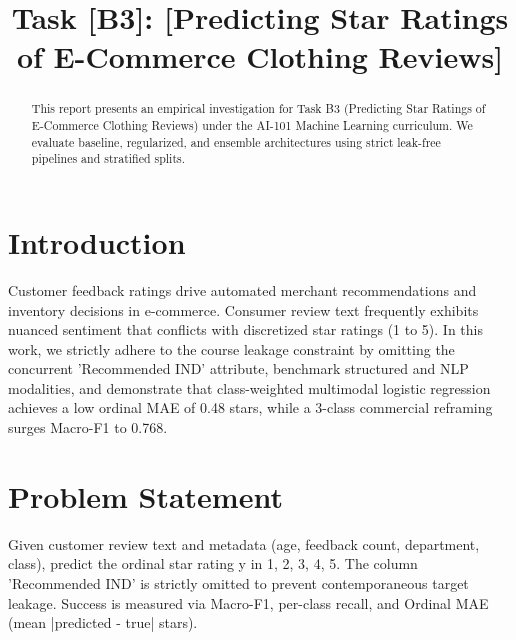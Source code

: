 \documentclass[conference]{IEEEtran}
\begin{document}
\title{Task [B3]: [Predicting Star Ratings of E-Commerce Clothing Reviews]}

\author{
}

\maketitle

\begin{abstract}
This report presents an empirical investigation for Task B3 (Predicting Star Ratings of E-Commerce Clothing Reviews) under the AI-101 Machine Learning curriculum. We evaluate baseline, regularized, and ensemble architectures using strict leak-free pipelines and stratified splits.
\end{abstract}

\section{Introduction}
Customer feedback ratings drive automated merchant recommendations and inventory decisions in e-commerce. Consumer review text frequently exhibits nuanced sentiment that conflicts with discretized star ratings (1 to 5). In this work, we strictly adhere to the course leakage constraint by omitting the concurrent 'Recommended IND' attribute, benchmark structured and NLP modalities, and demonstrate that class-weighted multimodal logistic regression achieves a low ordinal MAE of 0.48 stars, while a 3-class commercial reframing surges Macro-F1 to 0.768.

\section{Problem Statement}
Given customer review text and metadata (age, feedback count, department, class), predict the ordinal star rating y in {1, 2, 3, 4, 5}. The column 'Recommended IND' is strictly omitted to prevent contemporaneous target leakage. Success is measured via Macro-F1, per-class recall, and Ordinal MAE (mean |predicted - true| stars).
\end{document}
